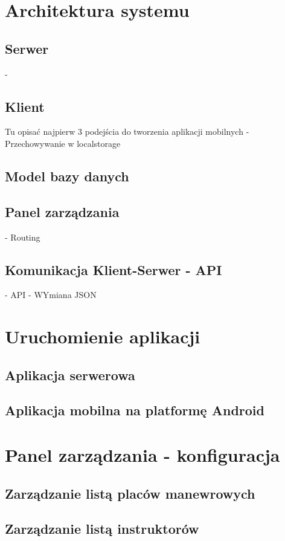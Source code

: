 \documentclass[twoside,a4paper]{book}
\begin{document}
\chapter{Architektura systemu}

\section{Serwer}
- 

\section{Klient}
Tu opisać najpierw 3 podejścia do tworzenia aplikacji mobilnych
- Przechowywanie w localstorage

\section{Model bazy danych}
\section{Panel zarządzania}
- Routing

\section{Komunikacja Klient-Serwer - API}
- API
- WYmiana JSON

\chapter{Uruchomienie aplikacji}
\section{Aplikacja serwerowa}
\section{Aplikacja mobilna na platformę Android}


\chapter{Panel zarządzania - konfiguracja}
\section{Zarządzanie listą placów manewrowych}
\section{Zarządzanie listą instruktorów}
\end{document}
